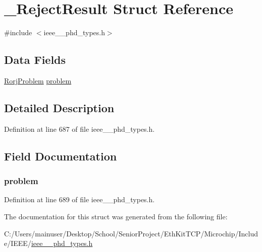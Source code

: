 \hypertarget{struct___reject_result}{}\section{\+\_\+\+Reject\+Result Struct Reference}
\label{struct___reject_result}


{\ttfamily \#include $<$ieee\+\_\+\_\+phd\+\_\+types.\+h$>$}

\subsection*{Data Fields}
\begin{DoxyCompactItemize}
\item 
\hyperlink{ieee__11073__phd__types_8h_a69c83796f8294685779ee67a0d43ef38}{Rorj\+Problem} \hyperlink{struct___reject_result_aec17fc46a66ea48533d5691b07fe5be4}{problem}
\end{DoxyCompactItemize}


\subsection{Detailed Description}


Definition at line 687 of file ieee\+\_\+\_\+phd\+\_\+types.\+h.



\subsection{Field Documentation}
\hypertarget{struct___reject_result_aec17fc46a66ea48533d5691b07fe5be4}{}
\subsubsection[{problem}]{ problem}\label{struct___reject_result_aec17fc46a66ea48533d5691b07fe5be4}


Definition at line 689 of file ieee\+\_\+\_\+phd\+\_\+types.\+h.



The documentation for this struct was generated from the following file\+:\begin{DoxyCompactItemize}
\item 
C\+:/\+Users/mainuser/\+Desktop/\+School/\+Senior\+Project/\+Eth\+Kit\+T\+C\+P/\+Microchip/\+Include/\+I\+E\+E\+E/\hyperlink{ieee__11073__phd__types_8h}{ieee\+\_\+\_\+phd\+\_\+types.\+h}\end{DoxyCompactItemize}
